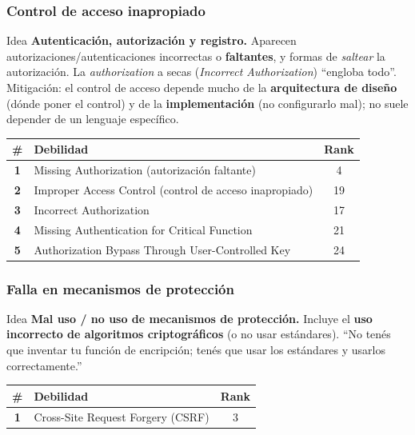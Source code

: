 \documentclass[11pt,a4paper]{article}
\begin{document}
\subsubsection{Control de acceso inapropiado}
\begin{practbox}{Idea}
\textbf{Autenticación, autorización y registro.} Aparecen autorizaciones/autenticaciones
incorrectas o \textbf{faltantes}, y formas de \emph{saltear} la autorización. La
\emph{authorization} a secas (\emph{Incorrect Authorization}) ``engloba todo''. Mitigación: el
control de acceso depende mucho de la \textbf{arquitectura de diseño} (dónde poner el control) y
de la \textbf{implementación} (no configurarlo mal); no suele depender de un lenguaje específico.
\end{practbox}
\begin{center}
\renewcommand{\arraystretch}{1.25}
\begin{tabular}{>{\bfseries}c p{8.8cm} c}
\toprule
\# & Debilidad & Rank \\
\midrule
1 & Missing Authorization (autorización faltante) & 4 \\
2 & Improper Access Control (control de acceso inapropiado) & 19 \\
3 & Incorrect Authorization & 17 \\
4 & Missing Authentication for Critical Function & 21 \\
5 & Authorization Bypass Through User-Controlled Key & 24 \\
\bottomrule
\end{tabular}
\end{center}

\subsubsection{Falla en mecanismos de protección}
\begin{practbox}{Idea}
\textbf{Mal uso / no uso de mecanismos de protección.} Incluye el \textbf{uso incorrecto de
algoritmos criptográficos} (o no usar estándares). ``No tenés que inventar tu función de
encripción; tenés que usar los estándares y usarlos correctamente.''
\end{practbox}
\begin{center}
\renewcommand{\arraystretch}{1.25}
\begin{tabular}{>{\bfseries}c p{8.8cm} c}
\toprule
\# & Debilidad & Rank \\
\midrule
1 & Cross-Site Request Forgery (CSRF) & 3 \\
\bottomrule
\end{tabular}
\end{center}
\end{document}
